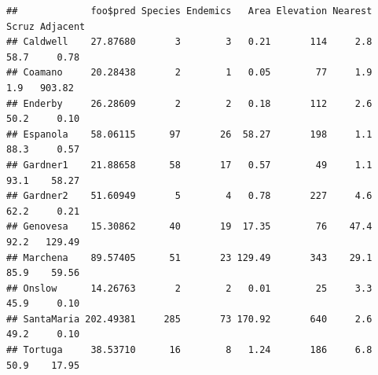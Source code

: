 \documentclass[
  ignorenonframetext,
]{beamer}
\begin{document}
\begin{frame}[fragile]{}
\begin{verbatim}
##             foo$pred Species Endemics   Area Elevation Nearest Scruz Adjacent
## Caldwell    27.87680       3        3   0.21       114     2.8  58.7     0.78
## Coamano     20.28438       2        1   0.05        77     1.9   1.9   903.82
## Enderby     26.28609       2        2   0.18       112     2.6  50.2     0.10
## Espanola    58.06115      97       26  58.27       198     1.1  88.3     0.57
## Gardner1    21.88658      58       17   0.57        49     1.1  93.1    58.27
## Gardner2    51.60949       5        4   0.78       227     4.6  62.2     0.21
## Genovesa    15.30862      40       19  17.35        76    47.4  92.2   129.49
## Marchena    89.57405      51       23 129.49       343    29.1  85.9    59.56
## Onslow      14.26763       2        2   0.01        25     3.3  45.9     0.10
## SantaMaria 202.49381     285       73 170.92       640     2.6  49.2     0.10
## Tortuga     38.53710      16        8   1.24       186     6.8  50.9    17.95
\end{verbatim}
\end{frame}
\end{document}
